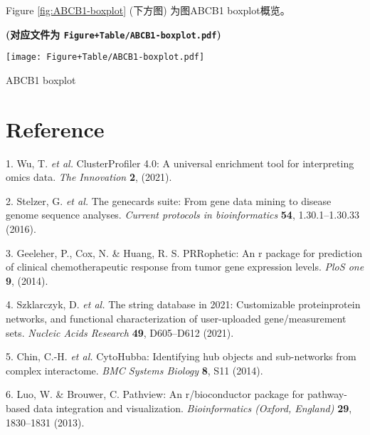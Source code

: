 \documentclass[
]{article}
\newenvironment{cslreferences}%
  {}%
  {\par}
\begin{document}
\begin{center}\vspace{1.5cm}\end{center}

\begin{center}\vspace{1.5cm}\end{center}

Figure \ref{fig:ABCB1-boxplot} (下方图) 为图ABCB1 boxplot概览。

\textbf{(对应文件为 \texttt{Figure+Table/ABCB1-boxplot.pdf})}

\def\@captype{figure}
\begin{center}
\texttt{[image: Figure+Table/ABCB1-boxplot.pdf]}
\caption{ABCB1 boxplot}\label{fig:ABCB1-boxplot}
\end{center}

\begin{center}\vspace{1.5cm}\end{center}

\hypertarget{bibliography}{%
\section*{Reference}\label{bibliography}}

\hypertarget{refs}{}
\begin{cslreferences}
\leavevmode\hypertarget{ref-ClusterprofilerWuTi2021}{}%
1. Wu, T. \emph{et al.} ClusterProfiler 4.0: A universal enrichment tool for interpreting omics data. \emph{The Innovation} \textbf{2}, (2021).

\leavevmode\hypertarget{ref-TheGenecardsSStelze2016}{}%
2. Stelzer, G. \emph{et al.} The genecards suite: From gene data mining to disease genome sequence analyses. \emph{Current protocols in bioinformatics} \textbf{54}, 1.30.1--1.30.33 (2016).

\leavevmode\hypertarget{ref-PrropheticAnGeeleh2014}{}%
3. Geeleher, P., Cox, N. \& Huang, R. S. PRRophetic: An r package for prediction of clinical chemotherapeutic response from tumor gene expression levels. \emph{PloS one} \textbf{9}, (2014).

\leavevmode\hypertarget{ref-TheStringDataSzklar2021}{}%
4. Szklarczyk, D. \emph{et al.} The string database in 2021: Customizable proteinprotein networks, and functional characterization of user-uploaded gene/measurement sets. \emph{Nucleic Acids Research} \textbf{49}, D605--D612 (2021).

\leavevmode\hypertarget{ref-CytohubbaIdenChin2014}{}%
5. Chin, C.-H. \emph{et al.} CytoHubba: Identifying hub objects and sub-networks from complex interactome. \emph{BMC Systems Biology} \textbf{8}, S11 (2014).

\leavevmode\hypertarget{ref-PathviewAnRLuoW2013}{}%
6. Luo, W. \& Brouwer, C. Pathview: An r/bioconductor package for pathway-based data integration and visualization. \emph{Bioinformatics (Oxford, England)} \textbf{29}, 1830--1831 (2013).
\end{cslreferences}
\end{document}
